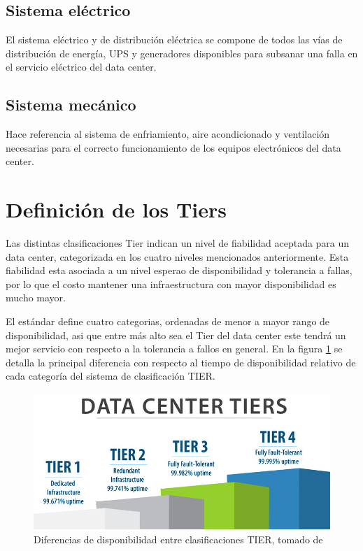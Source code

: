 \documentclass[journal]{IEEEtran}
\begin{document}
\subsection{Sistema eléctrico}
El sistema eléctrico y de distribución eléctrica se compone de todos las vías de distribución de energía, UPS y generadores disponibles para subsanar una falla en el servicio eléctrico del data center.
\subsection{Sistema mecánico}
Hace referencia al sistema de enfriamiento, aire acondicionado y ventilación necesarias para el correcto funcionamiento de los equipos electrónicos del data center.

\section{Definición de los Tiers}
Las distintas clasificaciones Tier indican un nivel de fiabilidad aceptada para un data center, categorizada en los cuatro
niveles mencionados anteriormente. Esta fiabilidad esta asociada a un nivel esperao de disponibilidad y tolerancia a fallas, por lo que el costo
mantener una infraestructura con mayor disponibilidad es mucho mayor.

El estándar define cuatro categorias, ordenadas de menor a mayor rango de disponibilidad, asi que entre más alto sea el Tier del data center
este tendrá un mejor servicio con respecto a la tolerancia a fallos en general. 
En la figura \ref{volico} se detalla la principal diferencia con respecto al tiempo de disponibilidad relativo de cada categoría del sistema de clasificación TIER.
\begin{figure}
  \centering
  \includegraphics[scale=0.3]{Data-Center-Tiers.jpg}
  \caption{Diferencias de disponibilidad entre clasificaciones TIER, tomado de \cite{volico_2018}}
  \label{volico}
\end{figure}
\end{document}
